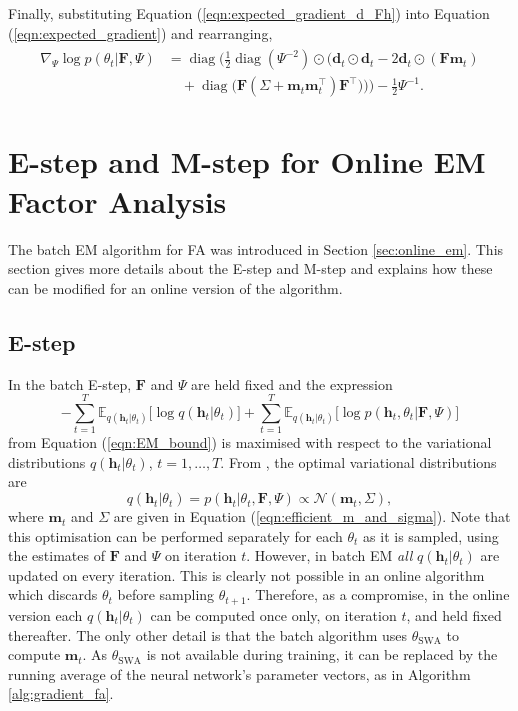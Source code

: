 \documentclass[msc,deptreport.inf]{infthesis} %
\newcommand{\matr}[1]{\mathbf{#1}}
\newcommand{\E}{\mathbb E}
\newcommand{\diag}{\mathop{\mathrm{diag}}}
\begin{document}
Finally, substituting Equation (\ref{eqn:expected_gradient_d_Fh}) into Equation (\ref{eqn:expected_gradient}) and rearranging, 
\begin{align}
\begin{split}%
	\nabla_{\Psi} \log p(\theta_t | \matr{F}, \Psi) 
	& = \diag\Bigg(\frac{1}{2} \diag(\Psi^{-2}) \odot \Big(\matr{d}_t \odot \matr{d}_t - 2\matr{d}_t \odot (\matr{F} \matr{m}_t) \\
	& \quad + \diag\big( \matr{F} (\Sigma + \matr{m}_t \matr{m}_t^\intercal) \matr{F}^\intercal \big) \Big) \Bigg)
	 - \frac{1}{2} \Psi^{-1}.
\end{split}
\end{align} 

\section{E-step and M-step for Online EM Factor Analysis}\label{app:online_em_steps}

The batch EM algorithm for FA was introduced in Section \ref{sec:online_em}. This section gives more details about the E-step and M-step and explains how these can be modified for an online version of the algorithm.

\subsection{E-step}

In the batch E-step, $\matr{F}$ and $\Psi$ are held fixed and the expression
\begin{equation}\label{eqn:EM_objective}
	- \sum_{t=1}^T \E_{q(\matr{h}_t | \theta_t)} \big[\log q(\matr{h}_t | \theta_t)\big]
	+ \sum_{t=1}^T \E_{q(\matr{h}_t | \theta_t)} \big[\log p(\matr{h}_t, \theta_t | \matr{F}, \Psi)\big]
\end{equation}
from Equation (\ref{eqn:EM_bound}) is maximised with respect to the variational distributions $q(\matr{h}_t | \theta_t)$, $t=1,\dots,T$. From \cite{barber2007}, the optimal variational distributions are 
\begin{equation}
	q(\matr{h}_t | \theta_t) = p(\matr{h}_t | \theta_t, \matr{F}, \Psi)  \propto \mathcal{N}(\matr{m}_t, \Sigma), 
\end{equation}
where $\matr{m}_t$ and $\Sigma$ are given in Equation (\ref{eqn:efficient_m_and_sigma}). Note that this optimisation can be performed separately for each $\theta_t$ as it is sampled, using the estimates of $\matr{F}$ and $\Psi$ on iteration $t$. However, in batch EM \emph{all} $q(\matr{h}_t | \theta_t)$ are updated on every iteration. This is clearly not possible in an online algorithm which discards $\theta_t$ before sampling $\theta_{t + 1}$. Therefore, as a compromise, in the online version each $q(\matr{h}_t | \theta_t)$ can be computed once only, on iteration $t$, and held fixed thereafter. The only other detail is that the batch algorithm uses $\theta_{\text{SWA}}$ to compute $\matr{m}_t$. As $\theta_{\text{SWA}}$ is not available during training, it can be replaced by the running average of the neural network's parameter vectors, as in Algorithm \ref{alg:gradient_fa}.
\end{document}
